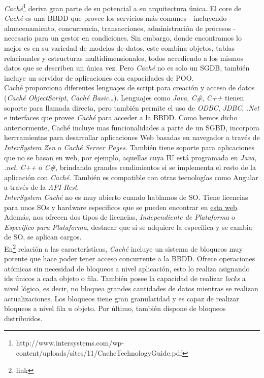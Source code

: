 \documentclass{article}
\begin{document}
\emph{Caché}\footnote{http://www.intersystems.com/wp-content/uploads/sites/11/CacheTechnologyGuide.pdf} deriva gran parte de su potencial a su arquitectura única. El core de \emph{Caché} es una BBDD que provee los servicios más comunes - incluyendo almacenamiento, concurrencia, transacciones, administración de procesos - necesario para un gestor en condiciones. Sin embargo, donde encontramos lo mejor es en su variedad de modelos de datos, este combina objetos, tablas relacionales y estructuras multidimensionales, todos accediendo a los mismos datos que se describen un única vez. Pero \emph{Caché} no es solo un SGDB, también incluye un servidor de aplicaciones con capacidades de POO.  \\
Caché proporciona diferentes lenguajes de script para creación y acceso de datos (\emph{Caché ObjectScript}, \emph{Caché Basic}…). Lenguajes como \emph{Java},\emph{ C\#}, \emph{C++} tienen soporte para llamada directa, pero también permite el uso de \emph{ODBC}, \emph{JDBC}, \emph{.Net} e interfaces que provee \emph{Caché} para acceder a la BBDD. Como hemos dicho anteriormente, Caché incluye mas funcionalidades a parte de un SGBD, incorpora herrramientas para desarrollar aplicaciones Web basadas en navegador a través de\emph{ InterSystem Zen} o \emph{Caché Server Pages}. También tiene soporte para aplicaciones que no se basan en web, por ejemplo, aquellas cuya IU está programada en \emph{Java}, \emph{.net},\emph{ C++} o\emph{ C\#}, brindando grandes rendimientos si se implementa el resto de la aplicación con \emph{Caché}. También es compatible con otras tecnologías como Angular a través de la \emph{API Rest}.\\

\emph{InterSystem Caché }no es muy abierto cuando hablamos de SO. Tiene licencias para unos SOs y hardware especificos que se pueden encontrar en \href{https://www.intersystems.com/support-learning/support/cache-licensing-platforms/}{esta web}. Además, nos ofrecen dos tipos de licencias, \emph{Independiente de Plataforma} o \emph{Especifico para Plataforma}, destacar que si se adquiere la específica y se cambia de SO, se aplican cargos. \\

En\footnote{link} relación a las características, \emph{Caché} incluye un sistema de bloqueos muy potente que hace poder tener acceso concurrente a la BBDD. Ofrece operaciones atómicas sin necesidad de bloqueos a nivel aplicación, esto lo realiza asignando ids únicos a cada objeto o fila. También posee la capacidad de realizar \emph{locks} a nivel lógico, es decir, no bloquea grandes cantidades de datos mientras se realizan actualizaciones. Los bloqueos tiene gran granularidad y es capaz de realizar bloqueos a nivel fila u objeto. Por último, también dispone de bloqueos distribuidos.\\
\end{document}
